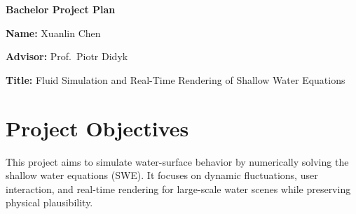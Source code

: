 \documentclass[12pt,a4paper]{article}
\begin{document}
\begin{titlepage}
\vspace*{\fill}
\begin{center}
{\LARGE \textbf{Bachelor Project Plan}\par}
\end{center}
\vspace{2em}
\raggedright
{\large \textbf{Name:} Xuanlin Chen\par}
{\large \textbf{Advisor:} Prof.\ Piotr Didyk\par}
{\large \textbf{Title:} Fluid Simulation and Real-Time Rendering of Shallow Water Equations\par}
\vspace*{\fill}
\end{titlepage}

\section*{Project Objectives}
This project aims to simulate water-surface behavior by numerically solving the shallow water equations (SWE). It focuses on dynamic fluctuations, user interaction, and real-time rendering for large-scale water scenes while preserving physical plausibility.
\end{document}
